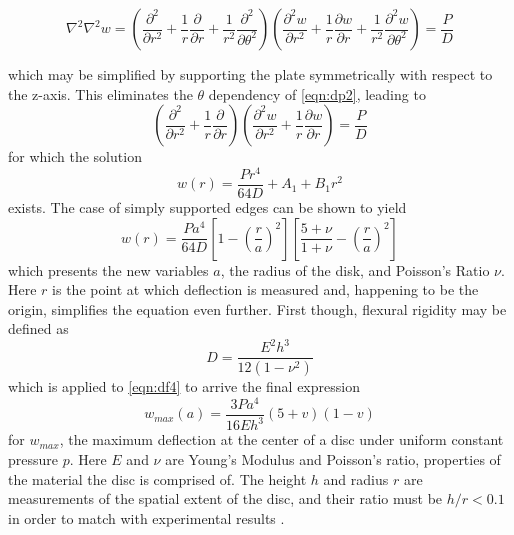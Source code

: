 \documentclass[12pt,times,twocolumn,3p]{elsarticle}
\begin{document}
\begin{strip}
\noindent\makebox[\linewidth][l]{\rule{0.4\textwidth}{0.4pt}}
\begin{equation} \label{eqn:dp2}
\nabla^2\nabla^2 w =
\left(\frac{\partial^2}{\partial r^2} +
\frac{1}{r}\frac{\partial}{\partial r} +
\frac{1}{r^2}\frac{\partial^2}{\partial \theta^2}\right)
\left(\frac{\partial^2 w}{\partial r^2} +
\frac{1}{r}\frac{\partial w}{\partial r} +
\frac{1}{r^2}\frac{\partial^2 w}{\partial \theta^2}\right) =
\frac{P}{D}
\end{equation}
\begin{flushleft}
\noindent\makebox[\linewidth][r]{\rule{0.4\textwidth}{0.4pt}}
\end{flushleft}
\end{strip}

\noindent which may be simplified by supporting the plate symmetrically with
respect to the z-axis. This eliminates the $\theta$ dependency of \cref{eqn:dp2},
leading to
\begin{equation} \label{eqn:dp3}
\left(\frac{\partial^2}{\partial r^2} +
\frac{1}{r}\frac{\partial}{\partial r}
\right)
\left(\frac{\partial^2 w}{\partial r^2} +
\frac{1}{r}\frac{\partial w}{\partial r}
\right) = \frac{P}{D}
\end{equation}
for which the solution
\begin{equation}
w(r) = \frac{P r^4}{64 D} +A_1 +B_1 r^2
\end{equation}
exists. The case of simply supported edges can be shown \cite{boresi} to yield
\begin{equation} \label{eqn:df4}
w(r) = \frac{P a^4}{64 D}
\left[1-\left(\frac{r}{a}\right)^2\right]
\left[\frac{5+\nu}{1+\nu}-\left(\frac{r}{a}\right)^2\right]
\end{equation}
which presents the new variables $a$, the radius of the disk, and Poisson's Ratio
$\nu$. Here $r$ is the point at which deflection is measured and, happening to be
the origin, simplifies the equation even further. First though, flexural rigidity
may be defined as
\begin{equation}
D = \frac{E^2 h^3}{12(1 - \nu^2)}
\end{equation}
which is applied to \cref{eqn:df4} to arrive the final expression
\begin{equation} \label{eqn:def}
w_{max}(a) = \frac{3 P a^4}{16 E h^3}(5+v)(1-v)
\end{equation}
for $w_{max}$, the maximum deflection at the center of a disc under uniform
constant pressure $p$. Here $E$ and $\nu$ are Young's Modulus and Poisson's ratio,
properties of the material the disc is comprised of. The height $h$ and radius $r$
are measurements of the spatial extent of the disc, and their ratio must be
$h/r < 0.1$ in order to match with experimental results \cite{boresi}.
\end{document}
